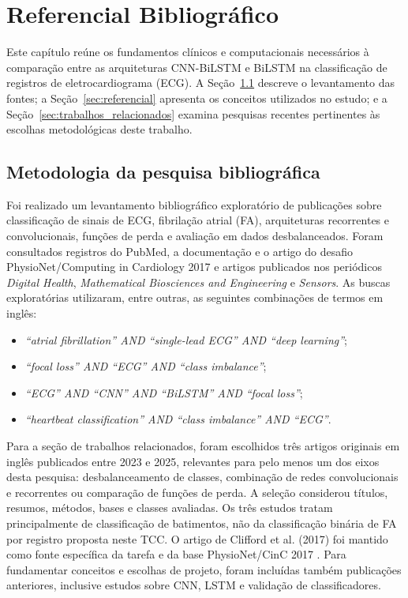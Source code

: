 \documentclass[
    12pt,                %
    openright,           %
    oneside,             %
    a4paper,             %
    english,             %
    brazil               %
]{abntex2}
\begin{document}
\chapter{Referencial Bibliográfico}
\label{cap:referencial}

Este capítulo reúne os fundamentos clínicos e computacionais necessários à comparação entre as arquiteturas CNN-BiLSTM e BiLSTM na classificação de registros de eletrocardiograma (ECG). A Seção~\ref{sec:metodologia_bibliografica} descreve o levantamento das fontes; a Seção~\ref{sec:referencial} apresenta os conceitos utilizados no estudo; e a Seção~\ref{sec:trabalhos_relacionados} examina pesquisas recentes pertinentes às escolhas metodológicas deste trabalho.

\section{Metodologia da pesquisa bibliográfica}
\label{sec:metodologia_bibliografica}

Foi realizado um levantamento bibliográfico exploratório de publicações sobre classificação de sinais de ECG, fibrilação atrial (FA), arquiteturas recorrentes e convolucionais, funções de perda e avaliação em dados desbalanceados. Foram consultados registros do PubMed, a documentação e o artigo do desafio PhysioNet/Computing in Cardiology 2017 e artigos publicados nos periódicos \textit{Digital Health}, \textit{Mathematical Biosciences and Engineering} e \textit{Sensors}. As buscas exploratórias utilizaram, entre outras, as seguintes combinações de termos em inglês:
\begin{itemize}
    \item \textit{``atrial fibrillation'' AND ``single-lead ECG'' AND ``deep learning''};
    \item \textit{``focal loss'' AND ``ECG'' AND ``class imbalance''};
    \item \textit{``ECG'' AND ``CNN'' AND ``BiLSTM'' AND ``focal loss''};
    \item \textit{``heartbeat classification'' AND ``class imbalance'' AND ``ECG''}.
\end{itemize}

Para a seção de trabalhos relacionados, foram escolhidos três artigos originais em inglês publicados entre 2023 e 2025, relevantes para pelo menos um dos eixos desta pesquisa: desbalanceamento de classes, combinação de redes convolucionais e recorrentes ou comparação de funções de perda. A seleção considerou títulos, resumos, métodos, bases e classes avaliadas. Os três estudos tratam principalmente de classificação de batimentos, não da classificação binária de FA por registro proposta neste TCC. O artigo de Clifford et al. (2017) foi mantido como fonte específica da tarefa e da base PhysioNet/CinC 2017 \cite{Clifford2017}. Para fundamentar conceitos e escolhas de projeto, foram incluídas também publicações anteriores, inclusive estudos sobre CNN, LSTM e validação de classificadores.
\end{document}
